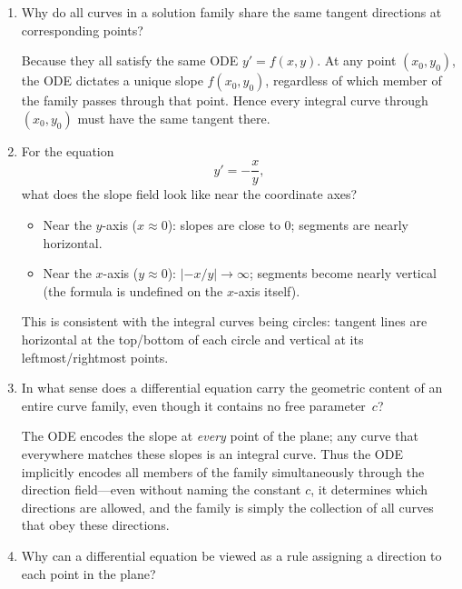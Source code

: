 \documentclass{self-check}
\begin{document}
\begin{enumerate}[leftmargin=*, itemsep=8pt]
    \begin{answer}
      A slope field (or direction field) is a plot over a grid of points \((x_{i},y_{j})\) of short line segments, each with slope \(y'=f(x_{i},y_{j})\). It gives a visual picture of all directions that integral curves must have; solution curves are precisely those that are everywhere tangent to these segments.
    \end{answer}
  \item Why do all curves in a solution family share the same tangent directions at corresponding points?

    \begin{answer}
      Because they all satisfy the same ODE \(y'=f(x,y)\). At any point \((x_{0},y_{0})\), the ODE dictates a unique slope \(f(x_{0},y_{0})\), regardless of which member of the family passes through that point. Hence every integral curve through \((x_{0},y_{0})\) must have the same tangent there.
    \end{answer}
  \item For the equation
    \[ y'=-\frac{x}{y}, \]
    what does the slope field look like near the coordinate axes?

    \begin{answer}
      \begin{itemize}
        \item Near the \(y\)-axis (\(x\approx 0\)): slopes are close to \(0\); segments are nearly horizontal.
        \item Near the \(x\)-axis (\(y\approx 0\)): \(|{-x/y}|\to\infty\); segments become nearly vertical (the formula is undefined on the \(x\)-axis itself).
      \end{itemize}
      This is consistent with the integral curves being circles: tangent lines are horizontal at the top/bottom of each circle and vertical at its leftmost/rightmost points.
    \end{answer}
  \item In what sense does a differential equation carry the geometric content of an entire curve family, even though it contains no free parameter~\(c\)?

    \begin{answer}
      The ODE encodes the slope at \emph{every} point of the plane; any curve that everywhere matches these slopes is an integral curve. Thus the ODE implicitly encodes all members of the family simultaneously through the direction field---even without naming the constant \(c\), it determines which directions are allowed, and the family is simply the collection of all curves that obey these directions.
    \end{answer}
  \item Why can a differential equation be viewed as a rule assigning a direction to each point in the plane?


\end{enumerate}
\end{document}
